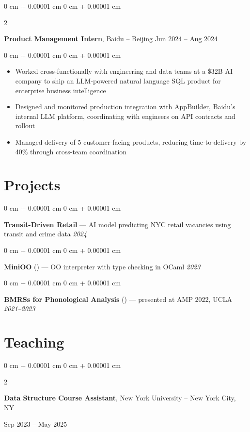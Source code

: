 \documentclass[10pt, letterpaper]{article}
\newenvironment{highlights}{
    \begin{itemize}[
        topsep=0.05 cm,
        parsep=0.05 cm,
        partopsep=0pt,
        itemsep=0pt,
        leftmargin=0 cm + 10pt
    ]
}{
    \end{itemize}
} %
\newenvironment{onecolentry}{
    \begin{adjustwidth}{
        0 cm + 0.00001 cm
    }{
        0 cm + 0.00001 cm
    }
}{
    \end{adjustwidth}
} %
\newenvironment{twocolentry}[2][]{
    \onecolentry
    \def\secondColumn{#2}
    \setcolumnwidth{\fill, 4.5 cm}
    \begin{paracol}{2}
}{
    \switchcolumn \raggedleft \secondColumn
    \end{paracol}
    \endonecolentry
} %
\begin{document}
        \begin{twocolentry}{
            Jun 2024 – Aug 2024
        }
            \textbf{Product Management Intern}, Baidu -- Beijing\end{twocolentry}

        \vspace{0.10 cm}
        \begin{onecolentry}
            \begin{highlights}
                \item Worked cross-functionally with engineering and data teams at a \$32B AI company to ship an LLM-powered natural language SQL product for enterprise business intelligence
                \item Designed and monitored production integration with AppBuilder, Baidu's internal LLM platform, coordinating with engineers on API contracts and rollout
                \item Managed delivery of 5 customer-facing products, reducing time-to-delivery by 40\% through cross-team coordination
            \end{highlights}
        \end{onecolentry}

    \section{Projects}
        \begin{onecolentry}
            \textbf{Transit-Driven Retail} — AI model predicting NYC retail vacancies using transit and crime data \hfill \textit{2024}
        \end{onecolentry}
        \vspace{0.05 cm}
        \begin{onecolentry}
            \textbf{MiniOO} (\href{https://github.com/v0lv0/minioo.git}{\color{blue}{github}}) — OO interpreter with type checking in OCaml \hfill \textit{2023}
        \end{onecolentry}
        \vspace{0.05 cm}
        \begin{onecolentry}
            \textbf{BMRSs for Phonological Analysis} (\href{https://github.com/rucll/bmrs}{\color{blue}{github}}) — presented at AMP 2022, UCLA \hfill \textit{2021–2023}
        \end{onecolentry}

    \section{Teaching}
        \begin{twocolentry}
            {Sep 2023 – May 2025}
            \textbf{Data Structure Course Assistant}, New York University -- New York City, NY
        \end{twocolentry}
\end{document}
